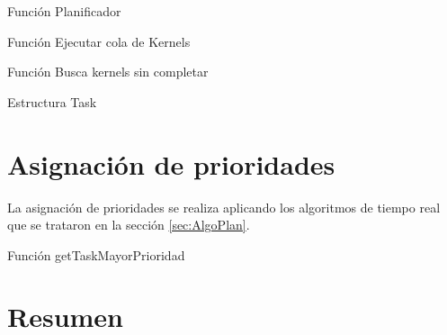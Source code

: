 Función Planificador


  
Función Ejecutar cola de Kernels



Función Busca kernels sin completar



Estructura Task


    	
\section{Asignación de prioridades}

La asignación de prioridades se realiza aplicando los algoritmos de tiempo real que se trataron en la sección \ref{sec:AlgoPlan}.

Función getTaskMayorPrioridad



\section{Resumen}




